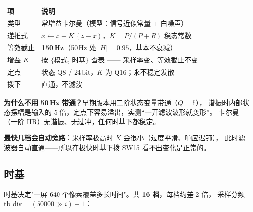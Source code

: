\documentclass[UTF8,a4paper,11pt]{ctexart}
\begin{document}
\begin{center}
\small
\begin{tabular}{ll}
\toprule
项 & 说明\\
\midrule
类型 & 常增益卡尔曼（模型：信号近似常量 + 白噪声）\\
递推式 & $x \leftarrow x + K\,(z-x)$，$K=P/(P+R)$ 稳态常数\\
等效截止 & \textbf{150\,Hz}（50\,Hz 处 $|H|=0.95$，基本不衰减）\\
增益 $K$ & 按 $\{$模式, 时基$\}$ 查表 —— 采样率变、等效截止不变\\
定点 & 状态 Q8 / 24\,bit，$K$ 为 Q16；永不稳定发散\\
拨下 & 直通，不滤波\\
\bottomrule
\end{tabular}
\end{center}

\begin{tipbox}
\textbf{为什么不用 50\,Hz 带通？}早期版本用二阶状态变量带通（$Q=5$），
谐振时内部状态摆幅是输入的 5 倍，定点下容易溢出，实测“一开滤波波形就变形”。
卡尔曼（一阶 IIR）无谐振、无过冲，任何时基下都稳定。
\end{tipbox}

\begin{tipbox}
\textbf{最快几档会自动旁路}：采样率极高时 $K$ 会很小（过度平滑、响应迟钝），
此时滤波器自动直通——所以在极快时基下拨 SW15 看不出变化是正常的。
\end{tipbox}


\subsection{时基}

时基决定"一屏 640 个像素覆盖多长时间"。共 \textbf{16 档}，每档约差 2 倍，
采样分频 $\mathrm{tb\_div}=(50000 \gg i)-1$：
\end{document}
